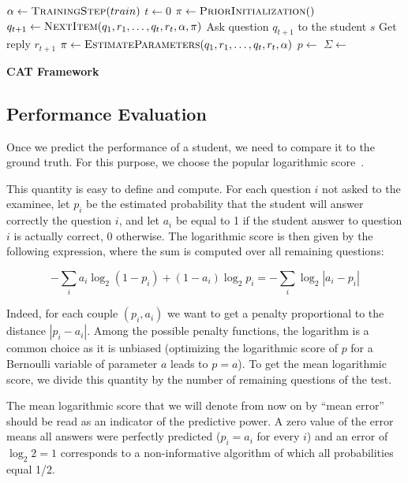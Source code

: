 \documentclass{edm_template}
\begin{document}
\begin{algorithm}
\begin{algorithmic}
\State $\alpha \gets \Call{TrainingStep}{train}$
\State $t \gets 0$
	\State $\pi \gets \Call{PriorInitialization}$
		\State $q_{t + 1} \gets \Call{NextItem}{q_1, r_1, \ldots, q_t, r_t, \alpha, \pi}$
		\State Ask question $q_{t + 1}$ to the student $s$
		\State Get reply $r_{t + 1}$
		\State $\pi \gets \Call{EstimateParameters}{q_1, r_1, \ldots, q_t, r_t, \alpha}$
		\State $p \gets$ 
		\State $\Sigma \gets$ 
	\EndWhile
\EndFor
\EndProcedure
\end{algorithmic}
\caption{\textbf{CAT Framework}}
\label{algo}
\end{algorithm}

\subsection{Performance Evaluation}

Once we predict the performance of a student, we need to compare it to the ground truth. For this purpose, we choose the popular logarithmic score~\cite{Gneiting2007}. 

This quantity is easy to define and compute. For each question $i$ not asked to the examinee, let $p_i$ be the estimated probability that the student will answer correctly the question $i$, and let $a_i$ be equal to 1 if the student answer to question $i$ is actually correct, 0 otherwise. The logarithmic score is then given by the following expression, where the sum is computed over all remaining questions: 

\[ - \sum_i a_i \log_2 (1 - p_i) + (1-a_i) \log_2 p_i = - \sum_i \log_2 | a_i - p_i | \]

Indeed, for each couple $(p_i, a_i)$ we want to get a penalty proportional to the distance $|p_i - a_i|$. Among the possible penalty functions, the logarithm is a common choice as it is unbiased (optimizing the logarithmic score of $p$ for a Bernoulli variable of parameter $a$ leads to $p=a$). To get the mean logarithmic score, we divide this quantity by the number of remaining questions of the test.

The mean logarithmic score that we will denote from now on by ``mean error'' should be read as an indicator of the predictive power. A zero value of the error means all answers were perfectly predicted ($p_i = a_i$ for every $i$) and an error of $\log_2 2 = 1$ corresponds to a non-informative algorithm of which all probabilities equal 1/2. 
\end{document}
